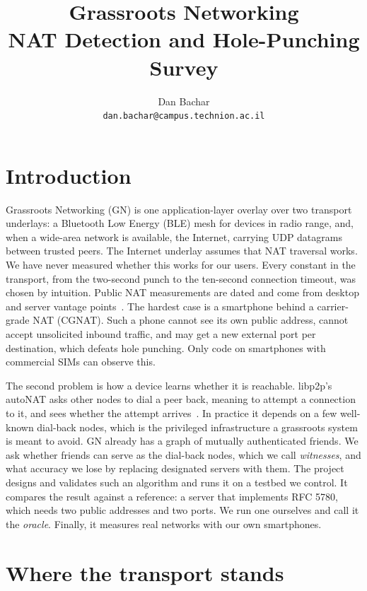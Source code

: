 \documentclass[11pt]{article}
\title{\vspace{-1.2cm}Grassroots Networking\\[0.2em]\large NAT Detection and Hole-Punching Survey}
\author{Dan Bachar \\ \small\texttt{dan.bachar@campus.technion.ac.il}}
\date{}
\begin{document}
\maketitle
\vspace{-0.8cm}


\section{Introduction}

Grassroots Networking (GN) is one application-layer overlay over two transport underlays: a Bluetooth Low Energy (BLE) mesh for devices in radio range, and, when a wide-area network is available, the Internet, carrying UDP datagrams between trusted peers. The Internet underlay assumes that NAT traversal works. We have never measured whether this works for our users. Every constant in the transport, from the two-second punch to the ten-second connection timeout, was chosen by intuition. Public NAT measurements are dated and come from desktop and server vantage points~\cite{Jennings2005,Guha2005}. The hardest case is a smartphone behind a carrier-grade NAT (CGNAT). Such a phone cannot see its own public address, cannot accept unsolicited inbound traffic, and may get a new external port per destination, which defeats hole punching. Only code on smartphones with commercial SIMs can observe this.

The second problem is how a device learns whether it is reachable. libp2p's autoNAT asks other nodes to dial a peer back, meaning to attempt a connection to it, and sees whether the attempt arrives~\cite{autonat}. In practice it depends on a few well-known dial-back nodes, which is the privileged infrastructure a grassroots system is meant to avoid. GN already has a graph of mutually authenticated friends. We ask whether friends can serve as the dial-back nodes, which we call \emph{witnesses}, and what accuracy we lose by replacing designated servers with them. The project designs and validates such an algorithm and runs it on a testbed we control. It compares the result against a reference: a server that implements RFC 5780, which needs two public addresses and two ports. We run one ourselves and call it the \emph{oracle}. Finally, it measures real networks with our own smartphones.

\section{Where the transport stands}
\end{document}
